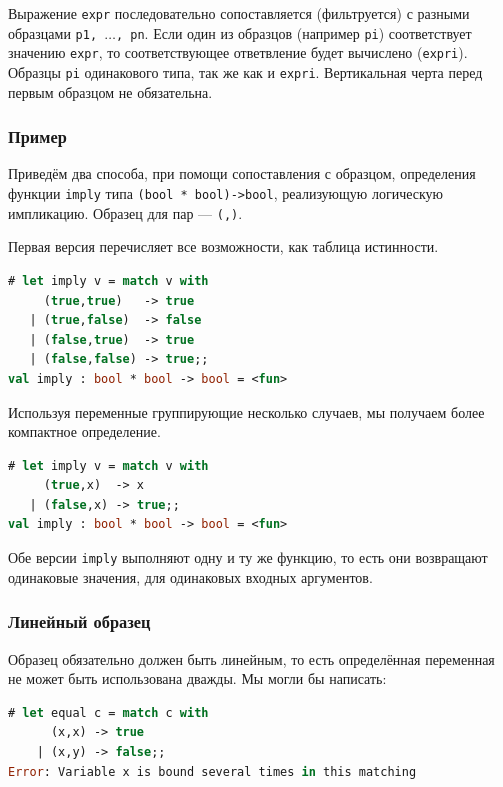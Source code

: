Выражение \texttt{expr} последовательно сопоставляется (фильтруется) с разными
образцами \texttt{p1, $\ldots$, pn}. Если один из образцов (например
\texttt{pi}) соответствует значению \texttt{expr}, то соответствующее
ответвление будет вычислено (\texttt{expri}). Образцы \texttt{pi} одинакового
типа, так же как и \texttt{expri}. Вертикальная черта перед первым образцом не
обязательна.

\subsubsection{Пример}

Приведём два способа, при помощи сопоставления с образцом, определения функции
\texttt{imply} типа \texttt{(bool * bool)->bool}, реализующую логическую
импликацию. Образец для пар --- \texttt{(,)}.

Первая версия перечисляет все возможности, как таблица истинности.

\begin{lstlisting}[language=OCaml]
# let imply v = match v with
     (true,true)   -> true
   | (true,false)  -> false
   | (false,true)  -> true
   | (false,false) -> true;;
val imply : bool * bool -> bool = <fun>
\end{lstlisting}

Используя переменные группирующие несколько случаев, мы получаем более
компактное определение.

\begin{lstlisting}[language=OCaml]
# let imply v = match v with
     (true,x)  -> x
   | (false,x) -> true;;
val imply : bool * bool -> bool = <fun>
\end{lstlisting}

Обе версии \texttt{imply} выполняют одну и ту же функцию, то есть они возвращают
одинаковые значения, для одинаковых входных аргументов.

\subsubsection{Линейный образец}

Образец обязательно должен быть линейным, то есть определённая переменная не
может быть использована дважды. Мы могли бы написать:

\begin{lstlisting}[language=OCaml]
# let equal c = match c with
      (x,x) -> true
    | (x,y) -> false;;
Error: Variable x is bound several times in this matching
\end{lstlisting}

